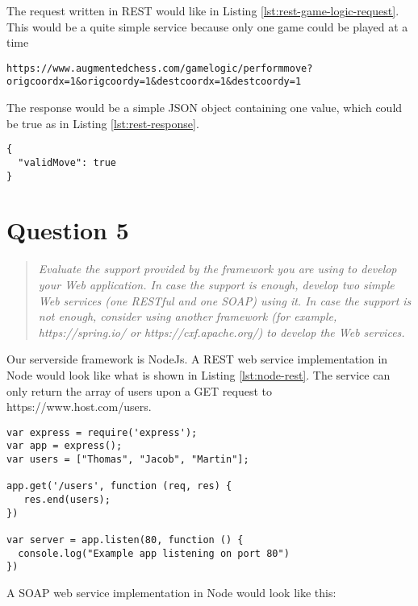 \documentclass[10pt,a4paper]{report}
\begin{document}
The request written in REST would like in Listing \ref{lst:rest-game-logic-request}. This would be a quite simple service because only one game could be played at a time

\begin{lstlisting}[caption="REST representation of Game Logic request", label={lst:rest-game-logic-request}]
https://www.augmentedchess.com/gamelogic/performmove?origcoordx=1&origcoordy=1&destcoordx=1&destcoordy=1
\end{lstlisting}

The response would be a simple JSON object containing one value, which could be true as in Listing \ref{lst:rest-response}.

\begin{lstlisting}[caption="REST representation of Game Logic reponse", label={lst:rest-response}]
{
  "validMove": true
}
\end{lstlisting}

\section{Question 5}
\begin{quote}
\textit{Evaluate the support provided by the framework you are using to develop your Web application. In case the support is enough, develop two simple Web services (one RESTful and one SOAP) using it. In case the support is not enough, consider using another framework (for example, https://spring.io/ or https://cxf.apache.org/) to develop the Web services.}
\end{quote}

Our serverside framework is NodeJs. A REST web service implementation in Node would look like what is shown in Listing \ref{lst:node-rest}. The service can only return the array of users upon a GET request to https://www.host.com/users.

\begin{lstlisting}[caption="Simple REST service in Node with the Express library", label={lst:node-rest}]
var express = require('express');
var app = express();
var users = ["Thomas", "Jacob", "Martin"];

app.get('/users', function (req, res) {
   res.end(users);
})

var server = app.listen(80, function () {
  console.log("Example app listening on port 80")
})
\end{lstlisting}

A SOAP web service implementation in Node would look like this:
\end{document}
